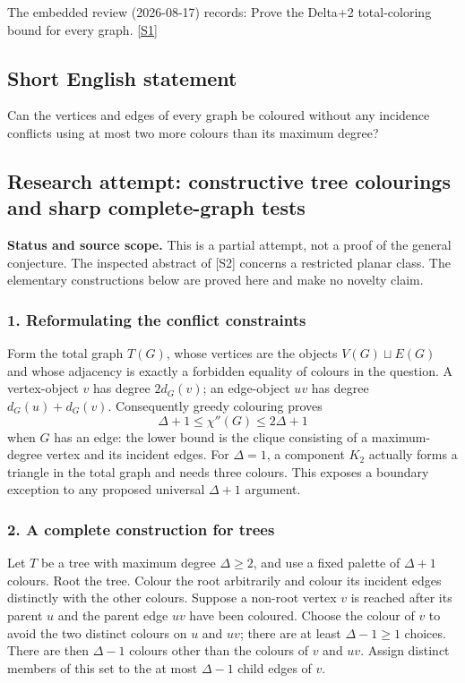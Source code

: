\documentclass[11pt,a4paper]{article}
\newcommand{\sref}[2]{\hyperlink{source:#1:#2}{[S#2]}}
\begin{document}
The embedded review (2026-08-17) records: Prove the Delta+2 total-coloring bound for every graph. \sref{statement}{1}

\subsection{Short English statement}

Can the vertices and edges of every graph be coloured without any incidence conflicts using at most two more colours than its maximum degree?

\subsection{Research attempt: constructive tree colourings and sharp complete-graph tests}
\textbf{Status and source scope.} This is a partial attempt, not a proof of the general conjecture. The inspected abstract of [S2] concerns a restricted planar class. The elementary constructions below are proved here and make no novelty claim.

\subsubsection{1. Reformulating the conflict constraints}
Form the total graph $T(G)$, whose vertices are the objects $V(G)\sqcup E(G)$ and whose adjacency is exactly a forbidden equality of colours in the question. A vertex-object $v$ has degree $2d_G(v)$; an edge-object $uv$ has degree $d_G(u)+d_G(v)$. Consequently greedy colouring proves
\[\Delta+1\leq\chi''(G)\leq2\Delta+1\]
when $G$ has an edge: the lower bound is the clique consisting of a maximum-degree vertex and its incident edges. For $\Delta=1$, a component $K_2$ actually forms a triangle in the total graph and needs three colours. This exposes a boundary exception to any proposed universal $\Delta+1$ argument.

\subsubsection{2. A complete construction for trees}
Let $T$ be a tree with maximum degree $\Delta\geq2$, and use a fixed palette of $\Delta+1$ colours. Root the tree. Colour the root arbitrarily and colour its incident edges distinctly with the other colours. Suppose a non-root vertex $v$ is reached after its parent $u$ and the parent edge $uv$ have been coloured. Choose the colour of $v$ to avoid the two distinct colours on $u$ and $uv$; there are at least $\Delta-1\geq1$ choices. There are then $\Delta-1$ colours other than the colours of $v$ and $uv$. Assign distinct members of this set to the at most $\Delta-1$ child edges of $v$.
\end{document}
